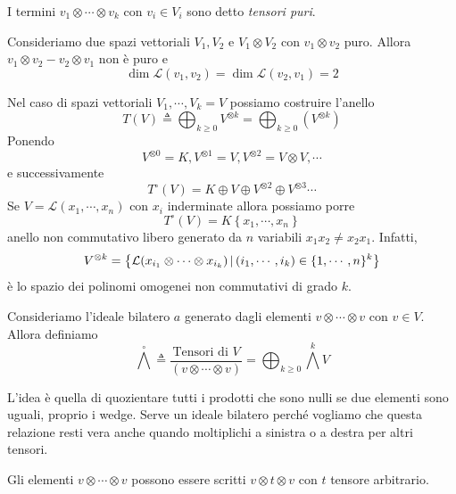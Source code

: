 \documentclass[a4paper]{article}
\begin{document}
I termini \(v_1 \otimes \cdots \otimes v_k\)
con \(v_i \in V_i\) sono detto \emph{tensori puri}.

\begin{snippetexample}{}
    Consideriamo due spazi vettoriali \(V_1, V_2\)
    e \(V_1 \otimes V_2\)
    con \(v_1 \otimes v_2\) puro.
    Allora \(v_1 \otimes v_2 - v_2 \otimes v_1\)
    non è puro e \[
        \dim \mathcal L(v_1, v_2)
        = \dim \mathcal L(v_2, v_1) = 2
    \]
\end{snippetexample}

Nel caso di spazi vettoriali \(V_1, \cdots, V_k = V\)
possiamo costruire l'anello
\[
    T(V) \triangleq \bigoplus_{k \geq 0}
    V^{\otimes k}
    = \bigoplus_{k \geq 0} \left(
        V^{\otimes k}
    \right)
\]
Ponendo \[
    V^{\otimes 0} = K,
    V^{\otimes 1} = V,
    V^{\otimes 2} = V \otimes V, \cdots
\]
e successivamente \[
    T^\circ(V)
    = K \oplus V \oplus V^{\otimes 2} \oplus V^{\otimes 3} \cdots
\]
Se \(V = \mathcal L(x_1, \cdots, x_n)\)
con \(x_i\) inderminate allora possiamo porre \[
    T^\circ(V) = K\left\{
        x_1, \cdots, x_n
    \right\}
\]
anello non commutativo libero generato da
\(n\) variabili \(x_1x_2 \neq x_2x_1\).
Infatti,\[
    V^{\otimes k}
    = \left\{
        \mathcal L(x_{i_1}\otimes \cdots \otimes x_{i_k})
        \,|\,
        (i_1, \cdots, i_k) \in \{1, \cdots, n\}^k
    \right\}
\]
è lo spazio dei polinomi
omogenei non commutativi
di grado \(k\).

\begin{snippetdefinition}{}
    Consideriamo l'ideale bilatero
    \(a\) generato dagli elementi
    \(v \otimes \cdots \otimes v\)
    con \(v \in V\). Allora definiamo \[
        \bigwedge^\circ \triangleq \frac{
            \text{Tensori di } V
        }{
            \left(
                v \otimes \cdots \otimes v
            \right)
        }
        = \bigoplus_{k \geq 0} \bigwedge^k V
    \]
\end{snippetdefinition}

L'idea è quella di quozientare tutti i prodotti che sono nulli
se due elementi sono uguali, proprio i  wedge.
Serve un ideale bilatero perché vogliamo che questa relazione resti vera anche
quando moltiplichi a sinistra o a destra per altri tensori.

Gli elementi \(v \otimes \cdots \otimes v\)
possono essere scritti \(v \otimes t \otimes v\)
con \(t\) tensore arbitrario.
\end{document}
